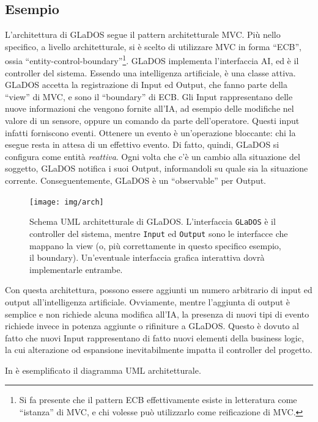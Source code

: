 \documentclass[a4paper,12pt]{report}
\begin{document}
\subsection*{Esempio}

L'architettura di GLaDOS segue il pattern architetturale MVC.
%
Più nello specifico, a livello architetturale, si è scelto di utilizzare MVC in forma ``ECB'', ossia ``entity-control-boundary''\footnote{
Si fa presente che il pattern ECB effettivamente esiste in letteratura come ``istanza'' di MVC, e chi volesse può utilizzarlo come reificazione di MVC.
}.
%
GLaDOS implementa l'interfaccia AI, ed è il controller del sistema.
Essendo una intelligenza artificiale, è una classe attiva.
%
GLaDOS accetta la registrazione di Input ed Output, che fanno parte della ``view'' di MVC, e sono il ``boundary'' di ECB.
Gli Input rappresentano delle nuove informazioni che vengono fornite all'IA, ad esempio delle modifiche nel valore di un sensore, oppure un comando da parte dell'operatore.
Questi input infatti forniscono eventi.
Ottenere un evento è un'operazione bloccante: chi la esegue resta in attesa di un effettivo evento. 
Di fatto, quindi, GLaDOS si configura come entità \textit{reattiva}.
Ogni volta che c'è un cambio alla situazione del soggetto, GLaDOS notifica i suoi Output, 
informandoli su quale sia la situazione corrente.
%
Conseguentemente, GLaDOS è un ``observable'' per Output.

\begin{figure}[!t]
\centering{}
\texttt{[image: img/arch]}
\caption{Schema UML architetturale di GLaDOS. L'interfaccia \texttt{GLaDOS} è il controller del sistema, mentre \texttt{Input} ed \texttt{Output} sono le interfacce che mappano la view (o, più correttamente in questo specifico esempio, il boundary). Un'eventuale interfaccia grafica interattiva dovrà implementarle entrambe.}
\label{img:goodarch}
\end{figure}

Con questa architettura, possono essere aggiunti un numero arbitrario di input ed output 
all'intelligenza artificiale.
%
Ovviamente, mentre l'aggiunta di output è semplice e non richiede alcuna modifica all'IA, la 
presenza di nuovi tipi di evento richiede invece in potenza aggiunte o rifiniture a GLaDOS.
%
Questo è dovuto al fatto che nuovi Input rappresentano di fatto nuovi elementi della business 
logic, la cui alterazione od espansione inevitabilmente impatta il controller del progetto.

In  è esemplificato il diagramma UML architetturale.
\end{document}
